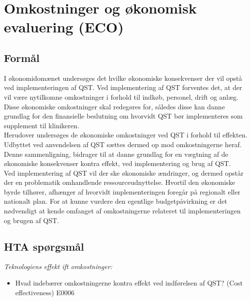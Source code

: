 \section{Omkostninger og økonomisk evaluering (ECO)}
\subsection{Formål}
I økonomidomænet undersøges det hvilke økonomiske konsekvenser der vil opstå ved implementeringen af QST. Ved implementering af QST forventes det, at der vil være nytilkomne omkostninger i forhold til indkøb, personel, drift og anlæg. Disse økonomiske omkostninger skal redegøres for, således disse kan danne grundlag for den finansielle beslutning om hvorvidt QST bør implementeres som supplement til klinikeren. \\
Herudover undersøges de økonomiske omkostninger ved QST i forhold til effekten. Udbyttet ved anvendelsen af QST sættes dermed op mod omkostningerne heraf. Denne sammenligning, bidrager til at danne grundlag for en vægtning af de økonomiske konsekvenser kontra effekt, ved implementering og brug af QST. \\ 
Ved implementering af  QST vil der ske økonomiske ændringer, og dermed opstår der en problematik omhandlende ressourceudnyttelse. Hvortil den økonomiske byrde tilhører, afhænger af hvorvidt implementeringen foregår på regionalt eller nationalt plan. For at kunne vurdere den egentlige budgetpåvirkning er det nødvendigt at kende omfanget af  omkostningerne relateret til implementeringen og brugen af QST. 
\subsection{HTA spørgsmål}
\textit{Teknologiens effekt ift omkostninger:}
\begin{itemize}
	\item Hvad indebærer omkostningerne kontra effekt ved indførelsen af QST? (Cost effectiveness) E0006 
\end{itemize}

